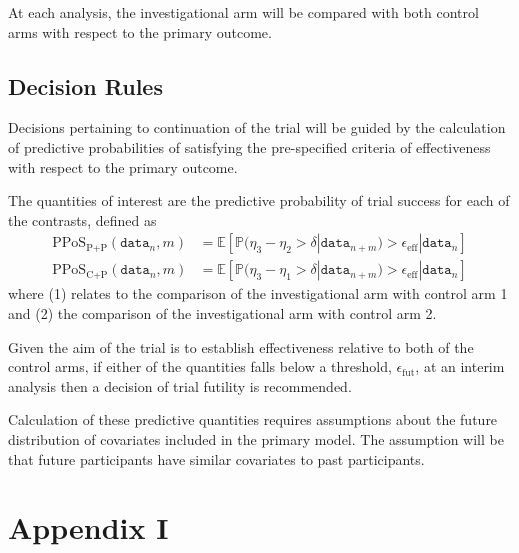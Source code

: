 \documentclass[11pt,parskip=half-]{scrartcl}
\begin{document}
At each analysis, the investigational arm will be compared with both control arms with respect to the primary outcome.

\subsection{Decision Rules}

Decisions pertaining to continuation of the trial will be guided by the calculation of predictive probabilities of satisfying the pre-specified criteria of effectiveness with respect to the primary outcome.

The quantities of interest are the predictive probability of trial success for each of the contrasts, defined as
\begin{align}
    \text{PPoS}_{\text{P+P}}(\texttt{data}_n, m) & = \mathbb{E}[\mathbb{P}(\eta_3 - \eta_2 > \delta | \texttt{data}_{n+m}) > \epsilon_{\text{eff}} | \texttt{data}_n] \\
    \text{PPoS}_{\text{C+P}}(\texttt{data}_n, m) & = \mathbb{E}[\mathbb{P}(\eta_3 - \eta_1 > \delta | \texttt{data}_{n+m}) > \epsilon_{\text{eff}} | \texttt{data}_n]
\end{align}
where (1) relates to the comparison of the investigational arm with control arm 1 and (2) the comparison of the investigational arm with control arm 2. 

Given the aim of the trial is to establish effectiveness relative to both of the control arms, if either of the quantities falls below a threshold, $\epsilon_{\text{fut}}$, at an interim analysis then a decision of trial futility is recommended.

Calculation of these predictive quantities requires assumptions about the future distribution of covariates included in the primary model. The assumption will be that future participants have similar covariates to past participants.

\clearpage

\printbibliography[heading=bibintoc]

\clearpage

\section*{Appendix I}
\end{document}
